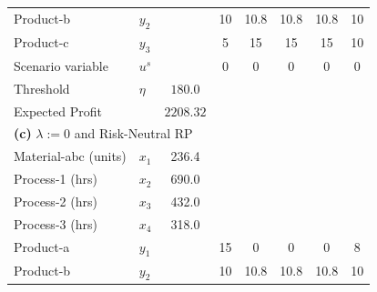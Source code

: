 \documentclass[7pt]{article}
\begin{document}
\begin{table}[h!]
\begin{tabular}{ll|c|ccccc}
        Product-b             & $y_2$                                      &                 & 10           & 10.8              & 10.8          & 10.8             & 10            \\
        Product-c             & $y_3$                                      &                 & 5            & 15                & 15            & 15               & 10            \\
        Scenario variable     & $u^s$                                      &                 & 0            & 0                 & 0             & 0                & 0             \\
        Threshold             & $\eta$                                     & $180.0$         &                                                                                     \\
        Expected Profit       &                                            & $2208.32$       &                                                                                     \\
        \midrule
        \multicolumn{8}{l}{\textbf{(c)} $\lambda := 0$ and Risk-Neutral RP}                                                                                                        \\
        \midrule
        Material-abc (units)  & $x_1$                                      & 236.4           &              &                   &               &                  &               \\
        Process-1 (hrs)       & $x_2$                                      & 690.0           &              &                   &               &                  &               \\
        Process-2 (hrs)       & $x_3$                                      & 432.0           &              &                   &               &                  &               \\
        Process-3 (hrs)       & $x_4$                                      & 318.0           &              &                   &               &                  &               \\
        Product-a             & $y_1$                                      &                 & 15           & 0                 & 0             & 0                & 8             \\
        Product-b             & $y_2$                                      &                 & 10           & 10.8              & 10.8          & 10.8             & 10            \\

\end{tabular}
\end{table}
\end{document}
